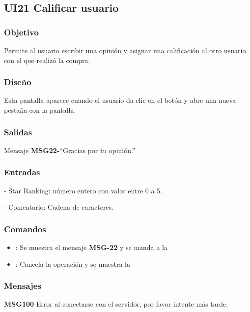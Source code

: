 \subsection{UI21 Calificar usuario}

\subsubsection{Objetivo}
	Permite al usuario escribir una opinión y asignar una calificación al otro usuario con el que realizó la compra.

\subsubsection{Diseño}
	Esta pantalla aparece cuando el usuario da clic en el botón  y abre una nueva pestaña con la pantalla.


\subsubsection{Salidas}

	Mensaje {\bf MSG22-}``Gracias por tu opinión.''

\subsubsection{Entradas}
	- Star Ranking: número entero con valor entre 0 a 5.
		
	- Comentario: Cadena de caracteres.
\subsubsection{Comandos}
\begin{itemize}
	\item {}: Se muestra el mensaje {\bf MSG-22} y se manda a la 
	\item {}: Cancela la operación y se muestra la 
\end{itemize}
\subsubsection{Mensajes}
	\begin{Citemize}
		\item {\bf MSG100} Error al conectarse con el servidor, por favor intente más tarde.
	\end{Citemize}